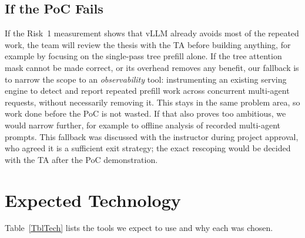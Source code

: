 \documentclass{article}
\begin{document}
\subsection{If the PoC Fails}

If the Risk~1 measurement shows that vLLM already avoids most of the
repeated work, the team will review the thesis with the TA before building
anything, for example by focusing on the single-pass tree prefill alone.
If the tree attention mask cannot be made correct, or its overhead removes
any benefit, our fallback is to narrow the scope
to an \emph{observability} tool: instrumenting an existing serving engine
to detect and report repeated prefill work across concurrent multi-agent
requests, without necessarily removing it. This stays in the same problem
area, so work done before the PoC is not wasted. If that also proves too
ambitious, we would narrow further, for example to offline analysis of
recorded multi-agent prompts. This fallback was discussed with the
instructor during project approval, who agreed it is a sufficient exit
strategy; the exact rescoping would be decided with the TA after the PoC
demonstration.

\section{Expected Technology}

Table~\ref{TblTech} lists the tools we expect to use and why each was
chosen.
\end{document}
